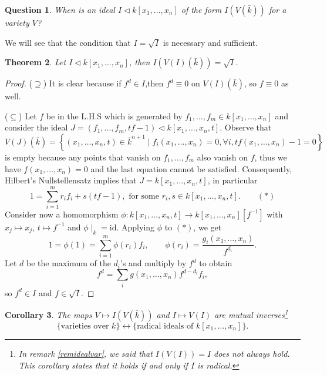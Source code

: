 \documentclass{tufte-handout} %
\newtheorem{thm}{Theorem}
\newtheorem{cor}[thm]{Corollary}
\newtheorem{quest}[thm]{Question}
\theoremstyle{definition}
\theoremstyle{remark}
\begin{document}
\begin{quest}
	When is an ideal $I \lhd k[x_1, \dots, x_n]$ of the form $I(V(\bar{k}))$ for a variety $V$?
\end{quest}
We will see that the condition that $I = \sqrt{I}$ is necessary and sufficient.
\begin{thm}
	Let $I \lhd k[x_1, \dots, x_n]$, then $I(V(I)(\bar{k})) = \sqrt{I}$.
\end{thm}
\begin{proof}
	($\supseteq$) It is clear because if $f^d \in I$,then $f^d \equiv 0$ on $V(I)(\bar{k})$, so $f \equiv 0$ as well.
	
	($\subseteq$) Let $f$ be in the L.H.S which is generated by $f_1, \dots, f_m \in k[x_1, \dots, x_n]$ and consider the ideal $J = (f_1, \dots, f_m, tf -1) \lhd k[x_1, \dots, x_n, t]$. Observe that 
	\[V(J)(\bar{k}) = \left\{(x_1, \dots, x_n, t) \in \bar{k}^{n+1} \mid f_i(x_1, \dots, x_n) = 0, \forall i, tf(x_1, \dots, x_n) -1 =0 \right\}\]
	is empty because any points that vanish on $f_1, \dots, f_m$ also vanish on $f$, thus we have $f(x_1, \dots, x_n)= 0$ and the last equation cannot be satisfied. Consequently, Hilbert's Nullstellensatz implies that $J = k[x_1, \dots, x_n, t]$, in particular
	\[1 = \sum_{i=1}^m r_i f_i + s(tf-1), \text{ for some }r_i,s \in k[x_1, \dots, x_n,t].\qquad (*)\]
	Consider now a homomorphism $\phi :k[x_1, \dots, x_n,t] \rightarrow k[x_1, \dots, x_n][f^{-1}]$ with $x_j \mapsto x_j$, $t \mapsto f^{-1}$ and $\phi\mid_k = \text{id}$. Applying $\phi$ to $(*)$, we get
	\[1 = \phi(1) = \sum_{i=1}^m \phi(r_i) f_i, \qquad \phi(r_i) = \frac{g_i(x_1, \dots, x_n)}{f^{d_i}}.\]
	Let $d$ be the maximum of the $d_i$'s and multiply by $f^d$ to obtain \[f^d = \sum_i g(x_1, \dots, x_n) f^{d-d_i}f_i,\] so $f^d \in I$ and $f \in \sqrt{I}$.
\end{proof}
\begin{cor}
	The maps $V \mapsto I(V(\bar{k}))$ and $I \mapsto V(I)$ are mutual inverses\footnote{In remark \ref{remidealvar}, we said that $I(V(I)) = I$ does not always hold. This corollary states that it holds if and only if $I$ is radical.} \[\{\text{varieties over } k\} \leftrightarrow \{\text{radical ideals of } k[x_1, \dots, x_n]\}.\]
\end{cor}
\end{document}
